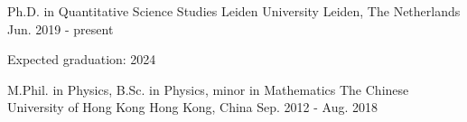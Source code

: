 

\begin{cventries}

  \cventry
    {Ph.D. in Quantitative Science Studies}
    {Leiden University} %
    {Leiden, The Netherlands} %
    {Jun. 2019 - present} %
    {
      \begin{cvitems} %
        \item {Expected graduation: 2024}
      \end{cvitems}
    }

  \cventry
    {M.Phil. in Physics, B.Sc. in Physics, minor in Mathematics} %
    {The Chinese University of Hong Kong} %
    {Hong Kong, China} %
    {Sep. 2012 - Aug. 2018} %
    {}


\end{cventries}
